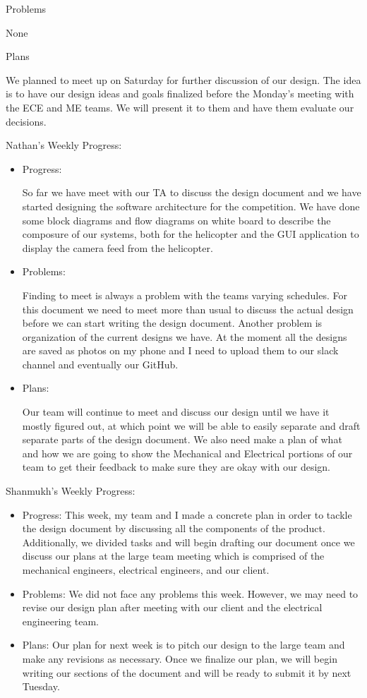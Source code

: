 \documentclass[onecolumn, oneside, letterpaper, draftclsnofoot, 10pt, compsoc]{IEEEtran}
\begin{document}
Problems

None

Plans

We planned to meet up on Saturday for further discussion of our design. The idea is to have our design ideas and goals finalized before the Monday's meeting with the ECE and ME teams. We will present it to them and have them evaluate our decisions.


Nathan's Weekly Progress:
\begin{itemize}
    \item Progress:

So far we have meet with our TA to discuss the design document and we have started designing the software architecture for the competition. We have done some block diagrams and flow diagrams on white board to describe the composure of our systems, both for the helicopter and the GUI application to display the camera feed from the helicopter.
    \item Problems:

Finding to meet is always a problem with the teams varying schedules. For this document we need to meet more than usual to discuss the actual design before we can start writing the design document. Another problem is organization of the current designs we have. At the moment all the designs are saved as photos on my phone and I  need to upload them to our slack channel and eventually our GitHub.
    \item Plans:

Our team will continue to meet and discuss our design until we have it mostly figured out, at which point we will be able to easily separate and draft separate parts of the design document. We also need make a plan of what and how we are going to show the Mechanical and Electrical portions of our team to get their feedback to make sure they are okay with our design.
    \end{itemize}
Shanmukh's Weekly Progress:
\begin{itemize}
    \item Progress: This week, my team and I made a concrete plan in order to tackle the design document by discussing all the components of the product. Additionally, we divided tasks and will begin drafting our document once we discuss our plans at the large team meeting which is comprised of the mechanical engineers, electrical engineers, and our client.
    \item Problems: We did not face any problems this week. However, we may need to revise our design plan after meeting with our client and the electrical engineering team.
    \item Plans: Our plan for next week is to pitch our design to the large team and make any revisions as necessary. Once we finalize our plan, we will begin writing our sections of the document and will be ready to submit it by next Tuesday.
\end{itemize}
\end{document}
